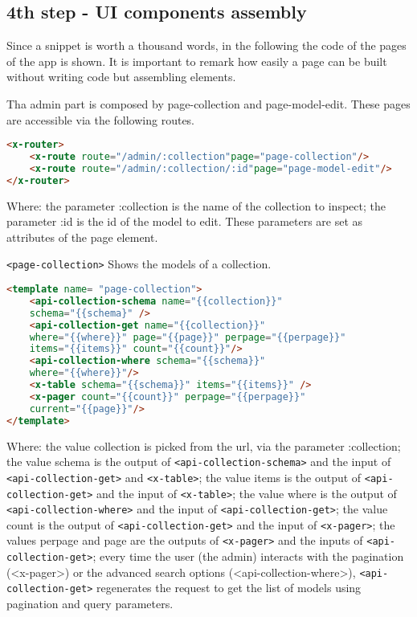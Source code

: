 \subsection{4th step - UI components assembly}

Since a snippet is worth a thousand words, in the following the code of the pages of the app is shown. It is important to remark how easily a page can be built without writing code but assembling elements.

Tha admin part is composed by page-collection and page-model-edit. These pages are accessible via the following routes.

\begin{lstlisting}[language=html]
<x-router>
	<x-route route="/admin/:collection"page="page-collection"/>
	<x-route route="/admin/:collection/:id"page="page-model-edit"/>
</x-router>
\end{lstlisting}

Where: the parameter :collection is the name of the collection to inspect; the parameter :id is the id of the model to edit. These parameters are set as attributes of the page element.

\begin{itemize} \texttt{<page-collection>} Shows the models of a collection.

\begin{lstlisting}[language=html]
<template name= "page-collection">
	<api-collection-schema name="{{collection}}" 
	schema="{{schema}" />
	<api-collection-get name="{{collection}}" 
	where="{{where}}" page="{{page}}" perpage="{{perpage}}"
	items="{{items}}" count="{{count}}"/>
	<api-collection-where schema="{{schema}}" 
	where="{{where}}"/>
	<x-table schema="{{schema}}" items="{{items}}" />
	<x-pager count="{{count}}" perpage="{{perpage}}" 
	current="{{page}}"/>
</template>
\end{lstlisting}

Where: the value collection is picked from the url, via the parameter :collection; the value schema is the output of \texttt{<api-collection-schema>} and the input of \texttt{<api-collection-get>} and \texttt{<x-table>}; the value items is the output of \texttt{<api-collection-get>} and the input of \texttt{<x-table>}; the value where is the output of \texttt{<api-collection-where>} and the input of \texttt{<api-collection-get>}; the value count is the output of \texttt{<api-collection-get>} and the input of \texttt{<x-pager>}; the values perpage and page are the outputs of \texttt{<x-pager>} and the inputs of \texttt{<api-collection-get>}; every time the user (the admin) interacts with the pagination (<x-pager>) or the advanced search options (<api-collection-where>), \texttt{<api-collection-get>} regenerates the request to get the list of models using pagination and query parameters.

\end{itemize}
